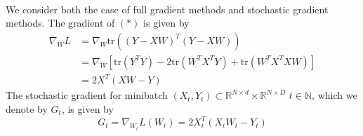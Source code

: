\documentclass[12pt]{book}
\newcommand{\N}{\mathbb{N}}
\newcommand{\R}{\mathbb{R}}
\begin{document}
\\
We consider both the case of full gradient methods and stochastic gradient methods. 
The gradient of $(*)$ is given by 
\begin{align*}
	\nabla_W L &= \nabla_W \text{tr}\left((Y - XW)^{T} (Y - XW)\right)\\
		   &= \nabla_W [\text{tr}(Y^TY)  - 2\text{tr}(W^{T}X^{T} Y) + \text{tr}(W^{T}X^{T}XW)]   \\
		   &= 2X^{T}(XW - Y)
\end{align*}
The stochastic gradient for minibatch $(X_t, Y_t)\subset \R^{N\times d} \times \R^{N\times D}$ $t\in\N$, which we denote by $G_t$, is given by 
\[
	G_t = \nabla_{W_t} L(W_t) = 2X_t^{T} (X_tW_t - Y_t)
\]

\begin{comment}
We consider the singular value decomposition (SVD) $X = U \Sigma V^{T}$ of the feature matrix. 
\\
Then the gradient $G$ (up to a constant) is given by:
 \[
G = X^{T}(XW - Y) = V\Sigma ^{T} U^{T}(U\Sigma V^{T} W - Y) = V^{T}\Sigma^{T}\Sigma \ VW - V\Sigma^{T} U Y
\]
The analytic solution (obtained by setting $\nabla_W L = 0$ due to convexity) is then given by:
\[
	(X^{T}X)^{-1}X^{T}Y = V \Sigma^{-2}V^{T} V \Sigma U^{T}Y = V \Sigma ^{-1} U^{T}Y 
\] 
Indeed 
Since the Muon update dictates considering NewtonSchulz$_n(G_t)$ which is just an approximation of the orthogonalization of $G_t$, we will study the singular value decomposition of $G$ at each time step and study how a variety of factors 
\\
It is well established that the condition number of the feature matrix is a good indicator of the problem's numerical stability and learning difficulty. Therefore we are interested in the interplay between
\end{comment}
\end{document}
